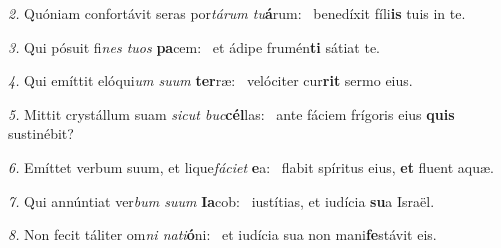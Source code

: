 \begin{psalmus}
\textit{\color{red}2.} Quóniam confortávit seras por\textit{tárum tu}\textbf{á}rum:~\grestar{}
benedíxit fíli\textbf{is} tuis in te.~\Abardot{}

\textit{\color{red}3.} Qui pósuit fi\textit{nes tuos} \textbf{pa}cem:~\grestar{}
et ádipe frumén\textbf{ti} sátiat te.~\Abardot{}

\textit{\color{red}4.} Qui emíttit elóqui\textit{um suum} \textbf{ter}ræ:~\grestar{}
velóciter cur\textbf{rit} sermo eius.~\Abardot{}

\textit{\color{red}5.} Mittit crystállum suam \textit{sicut buc}\textbf{cél}las:~\grestar{}
ante fáciem frígoris eius \textbf{quis} sustinébit?~\Abardot{}

\textit{\color{red}6.} Emíttet verbum suum, et lique\textit{fáciet} \textbf{e}a:~\grestar{}
flabit spíritus eius, \textbf{et} fluent aquæ.~\Abardot{}

\textit{\color{red}7.} Qui annúntiat ver\textit{bum suum} \textbf{Ia}cob:~\grestar{}
iustítias, et iudícia \textbf{su}a Israël.~\Abardot{}

\textit{\color{red}8.} Non fecit táliter om\textit{ni nati}\textbf{ó}ni:~\grestar{}
et iudícia sua non mani\textbf{fe}stávit eis.~\Abardot{}
\end{psalmus}
